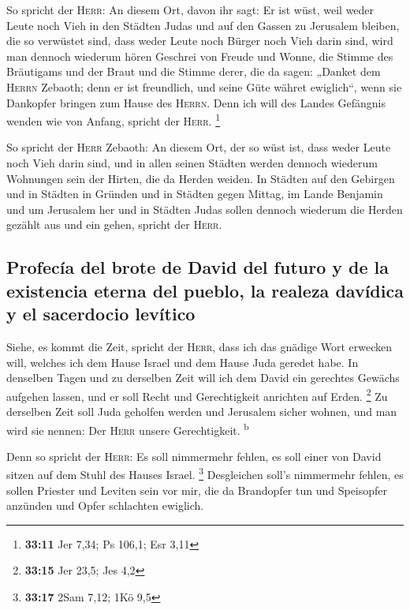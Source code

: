  So spricht der \textsc{Herr}: An diesem Ort, davon ihr
sagt: Er ist wüst, weil weder Leute noch Vieh in den Städten Judas und
auf den Gassen zu Jerusalem bleiben, die so verwüstet sind, dass weder
Leute noch Bürger noch Vieh darin sind,  wird man dennoch
wiederum hören Geschrei von Freude und Wonne, die Stimme des Bräutigams
und der Braut und die Stimme derer, die da sagen: „Danket dem
\textsc{Herrn} Zebaoth; denn er ist freundlich, und seine Güte währet
ewiglich``, wenn sie Dankopfer bringen zum Hause des \textsc{Herrn}.
Denn ich will des Landes Gefängnis wenden wie von Anfang, spricht der
\textsc{Herr}. \footnote{\textbf{33:11} Jer 7,34; Ps 106,1; Esr 3,11}

 So spricht der \textsc{Herr} Zebaoth: An diesem Ort, der
so wüst ist, dass weder Leute noch Vieh darin sind, und in allen seinen
Städten werden dennoch wiederum Wohnungen sein der Hirten, die da Herden
weiden.  In Städten auf den Gebirgen und in Städten in
Gründen und in Städten gegen Mittag, im Lande Benjamin und um Jerusalem
her und in Städten Judas sollen dennoch wiederum die Herden gezählt aus
und ein gehen, spricht der \textsc{Herr}.

\hypertarget{profecuxeda-del-brote-de-david-del-futuro-y-de-la-existencia-eterna-del-pueblo-la-realeza-davuxeddica-y-el-sacerdocio-levuxedtico}{%
\subsection{Profecía del brote de David del futuro y de la existencia
eterna del pueblo, la realeza davídica y el sacerdocio
levítico}\label{profecuxeda-del-brote-de-david-del-futuro-y-de-la-existencia-eterna-del-pueblo-la-realeza-davuxeddica-y-el-sacerdocio-levuxedtico}}

 Siehe, es kommt die Zeit, spricht der \textsc{Herr},
dass ich das gnädige Wort erwecken will, welches ich dem Hause Israel
und dem Hause Juda geredet habe.  In denselben Tagen und
zu derselben Zeit will ich dem David ein gerechtes Gewächs aufgehen
lassen, und er soll Recht und Gerechtigkeit anrichten auf Erden.
\footnote{\textbf{33:15} Jer 23,5; Jes 4,2}  Zu derselben
Zeit soll Juda geholfen werden und Jerusalem sicher wohnen, und man wird
sie nennen: Der \textsc{Herr} unsere Gerechtigkeit. \textsuperscript{b}

 Denn so spricht der \textsc{Herr}: Es soll nimmermehr
fehlen, es soll einer von David sitzen auf dem Stuhl des Hauses Israel.
\footnote{\textbf{33:17} 2Sam 7,12; 1Kö 9,5}  Desgleichen
soll's nimmermehr fehlen, es sollen Priester und Leviten sein vor mir,
die da Brandopfer tun und Speisopfer anzünden und Opfer schlachten
ewiglich.

